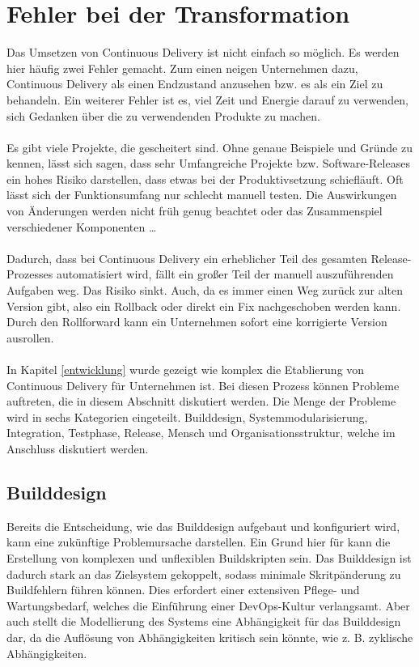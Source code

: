 \section{Fehler bei der Transformation} \label{Fehler bei der Transformation}

Das Umsetzen von Continuous Delivery ist nicht einfach so möglich. Es werden hier häufig zwei Fehler gemacht. Zum einen neigen Unternehmen dazu, Continuous Delivery als einen Endzustand anzusehen bzw. es als ein Ziel zu behandeln. Ein weiterer Fehler ist es, viel Zeit und Energie darauf zu verwenden, sich Gedanken über die zu verwendenden Produkte zu machen.\\ \\Es gibt viele Projekte, die gescheitert sind. Ohne genaue Beispiele und Gründe zu kennen, lässt sich sagen, dass sehr Umfangreiche Projekte bzw. Software-Releases ein hohes Risiko darstellen, dass etwas bei der Produktivsetzung schiefläuft. Oft lässt sich der Funktionsumfang nur schlecht manuell testen. Die Auswirkungen von Änderungen werden nicht früh genug beachtet oder das Zusammenspiel verschiedener Komponenten …\\ \\Dadurch, dass bei Continuous Delivery ein erheblicher Teil des gesamten Release-Prozesses automatisiert wird, fällt ein großer Teil der manuell auszuführenden Aufgaben weg. Das Risiko sinkt. Auch, da es immer einen Weg zurück zur alten Version gibt, also ein Rollback oder direkt ein Fix nachgeschoben werden kann. Durch den Rollforward kann ein Unternehmen sofort eine korrigierte Version ausrollen.\\ \\In Kapitel \ref{entwicklung} wurde gezeigt wie komplex die Etablierung von Continuous Delivery für Unternehmen ist. Bei diesen Prozess können Probleme auftreten, die in diesem Abschnitt diskutiert werden. Die Menge der Probleme wird in sechs Kategorien eingeteilt. Builddesign, Systemmodularisierung, Integration, Testphase, Release, Mensch und Organisationsstruktur, welche im Anschluss diskutiert werden.

\subsection{Builddesign} \label{builddesgin}
Bereits die Entscheidung, wie das Builddesign aufgebaut und konfiguriert wird, kann eine zukünftige Problemursache darstellen. Ein Grund hier für kann die Erstellung von komplexen und unflexiblen Buildskripten sein. Das Builddesign ist dadurch stark an das Zielsystem gekoppelt, sodass minimale Skritpänderung zu Buildfehlern führen können. Dies erfordert einer extensiven Pflege- und Wartungsbedarf, welches die Einführung einer DevOps-Kultur verlangsamt. Aber auch stellt die Modellierung des Systems eine Abhängigkeit für das Builddesign dar, da die Auflösung von Abhängigkeiten kritisch sein könnte, wie z. B. zyklische Abhängigkeiten.

